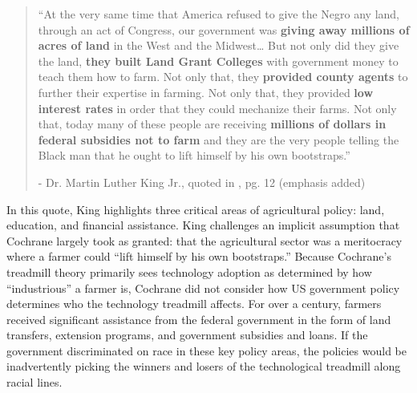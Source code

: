 \documentclass[12pt]{article}
\begin{document}
\begin{quote}
“At the very same time that America refused to give the Negro any land, through an act of Congress, our government was \textbf{giving away millions of acres of land} in the West and the Midwest… 
But not only did they give the land, \textbf{they built Land Grant Colleges} with government money to teach them how to farm. 
Not only that, they \textbf{provided county agents} to further their expertise in farming. 
Not only that, they provided \textbf{low interest rates} in order that they could mechanize their farms. 
Not only that, today many of these people are receiving \textbf{millions of dollars in federal subsidies not to farm} and they are the very people telling the Black man that he ought to lift himself by his own bootstraps.” 
\begin{center}
- Dr. Martin Luther King Jr., quoted in \citet{dyson_i_2000}, pg. 12 (emphasis added) \end{center}
\end{quote}

In this quote, King highlights three critical areas of agricultural policy: land, education, and financial assistance. 
King challenges an implicit assumption that Cochrane largely took as granted: that the agricultural sector was a meritocracy where a farmer could ``lift himself by his own bootstraps.''
Because Cochrane's treadmill theory primarily sees technology adoption as determined by how ``industrious'' a farmer is, Cochrane did not consider how US government policy determines who the technology treadmill affects. 
For over a century, farmers received significant assistance from the federal government in the form of land transfers, extension programs, and government subsidies and loans.
If the government discriminated on race in these key policy areas, the policies would be inadvertently picking the winners and losers of the technological treadmill along racial lines.
\end{document}
